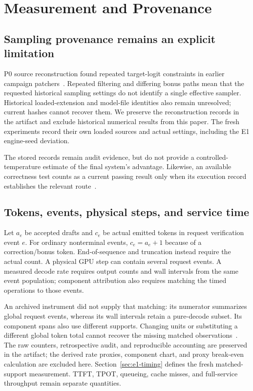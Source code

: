 \documentclass[conference]{IEEEtran}
\begin{document}
\appendices
\section{Measurement and Provenance}
\label{app:audit}
\subsection{Sampling provenance remains an explicit limitation}
P0 source reconstruction found repeated target-logit constraints in earlier campaign patchers~\cite{lumo2026levers}. Repeated filtering and differing bonus paths mean that the requested historical sampling settings do not identify a single effective sampler. Historical loaded-extension and model-file identities also remain unresolved; current hashes cannot recover them. We preserve the reconstruction records in the artifact and exclude historical numerical results from this paper. The fresh experiments record their own loaded sources and actual settings, including the E1 engine-seed deviation.

The stored records remain audit evidence, but do not provide a controlled-temperature estimate of the final system's advantage. Likewise, an available correctness test counts as a current passing result only when its execution record establishes the relevant route~\cite{lumo2026archive}.

\subsection{Tokens, events, physical steps, and service time}
Let $a_e$ be accepted drafts and $c_e$ be actual emitted tokens in request verification event $e$. For ordinary nonterminal events, $c_e=a_e+1$ because of a correction/bonus token. End-of-sequence and truncation instead require the actual count. A physical GPU step can contain several request events. A measured decode rate requires output counts and wall intervals from the same event population; component attribution also requires matching the timed operations to those events.

An archived instrument did not supply that matching: its numerator summarizes global request events, whereas its wall intervals retain a pure-decode subset. Its component spans also use different supports. Changing units or substituting a different global token total cannot recover the missing matched observations~\cite{lumo2026archive}. The raw counters, retrospective audit, and reproducible accounting are preserved in the artifact; the derived rate proxies, component chart, and proxy break-even calculation are excluded here. Section~\ref{sec:e1-timing} defines the fresh matched-support measurement. TTFT, TPOT, queueing, cache misses, and full-service throughput remain separate quantities.
\end{document}
